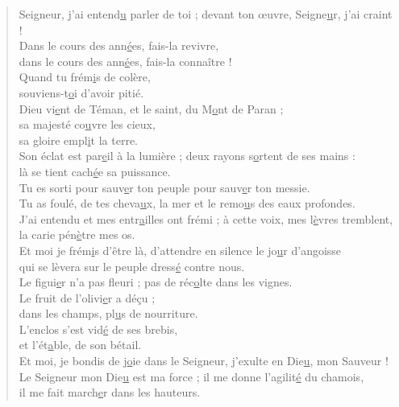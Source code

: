 \begin{verse}
Seigneur, j'ai entend\underline{u} parler de toi ;\psalmstar
devant ton œuvre, Seigne\underline{u}r, j'ai craint !\\
Dans le cours des ann\underline{é}es, fais-la revivre,\\
dans le cours des ann\underline{é}es, fais-la connaître !\\

Quand tu frém\underline{i}s de colère,\\
souviens-t\underline{o}i d'avoir pitié.\\

Dieu vi\underline{e}nt de Téman,\psalmstar
et le saint, du M\underline{o}nt de Paran ;\\
sa majesté co\underline{u}vre les cieux,\\
sa gloire empl\underline{i}t la terre.\\

Son éclat est par\underline{e}il à la lumière ; \psalmdagger
deux rayons s\underline{o}rtent de ses mains :\\
là se tient cach\underline{é}e sa puissance.\\

Tu es sorti pour sauv\underline{e}r ton peuple\psalmstar
pour sauv\underline{e}r ton messie.\\

Tu as foulé, de tes cheva\underline{u}x, la mer\psalmstar
et le remo\underline{u}s des eaux profondes.\\

J'ai entendu et mes entr\underline{a}illes ont frémi ; \psalmdagger
à cette voix, mes l\underline{è}vres tremblent,\\
la carie pén\underline{è}tre mes os.\\

Et moi je frém\underline{i}s d'être là, \psalmdagger
d'attendre en silence le jo\underline{u}r d'angoisse\\
qui se lèvera sur le peuple dress\underline{é} contre nous.\\

Le figui\underline{e}r n'a pas fleuri ;\psalmstar
pas de réc\underline{o}lte dans les vignes.\\
Le fruit de l'olivi\underline{e}r a déçu ;\\
dans les champs, pl\underline{u}s de nourriture.\\
L'enclos s'est vid\underline{é} de ses brebis,\\
et l'ét\underline{a}ble, de son bétail.\\

Et moi, je bondis de j\underline{o}ie dans le Seigneur,\psalmstar
j'exulte en Die\underline{u}, mon Sauveur !\\
Le Seigneur mon Die\underline{u} est ma force ; \psalmdagger
il me donne l'agilit\underline{é} du chamois,\\
il me fait march\underline{e}r dans les hauteurs.
\end{verse}

